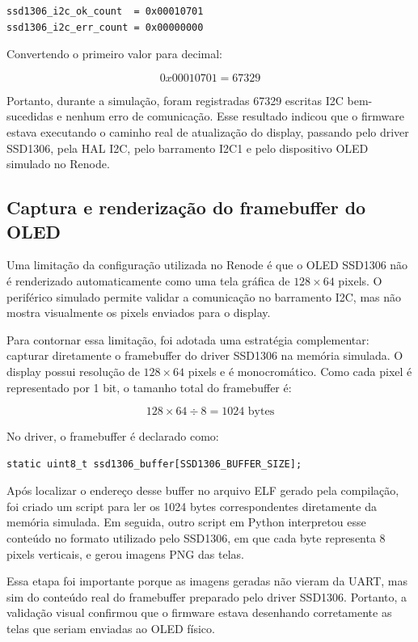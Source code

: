 \documentclass[a4paper,10pt]{article}
\begin{document}
\begin{verbatim}
ssd1306_i2c_ok_count  = 0x00010701
ssd1306_i2c_err_count = 0x00000000
\end{verbatim}

Convertendo o primeiro valor para decimal:

\[
0x00010701 = 67329
\]

Portanto, durante a simulação, foram registradas 67329 escritas I2C bem-sucedidas e nenhum erro de comunicação. Esse resultado indicou que o firmware estava executando o caminho real de atualização do display, passando pelo driver SSD1306, pela HAL I2C, pelo barramento I2C1 e pelo dispositivo OLED simulado no Renode.

\subsection{Captura e renderização do framebuffer do OLED}

Uma limitação da configuração utilizada no Renode é que o OLED SSD1306 não é renderizado automaticamente como uma tela gráfica de $128 \times 64$ pixels. O periférico simulado permite validar a comunicação no barramento I2C, mas não mostra visualmente os pixels enviados para o display.

Para contornar essa limitação, foi adotada uma estratégia complementar: capturar diretamente o framebuffer do driver SSD1306 na memória simulada. O display possui resolução de $128 \times 64$ pixels e é monocromático. Como cada pixel é representado por 1 bit, o tamanho total do framebuffer é:

\[
128 \times 64 \div 8 = 1024 \text{ bytes}
\]

No driver, o framebuffer é declarado como:

\begin{verbatim}
static uint8_t ssd1306_buffer[SSD1306_BUFFER_SIZE];
\end{verbatim}

Após localizar o endereço desse buffer no arquivo ELF gerado pela compilação, foi criado um script para ler os 1024 bytes correspondentes diretamente da memória simulada. Em seguida, outro script em Python interpretou esse conteúdo no formato utilizado pelo SSD1306, em que cada byte representa 8 pixels verticais, e gerou imagens PNG das telas.

Essa etapa foi importante porque as imagens geradas não vieram da UART, mas sim do conteúdo real do framebuffer preparado pelo driver SSD1306. Portanto, a validação visual confirmou que o firmware estava desenhando corretamente as telas que seriam enviadas ao OLED físico.
\end{document}
